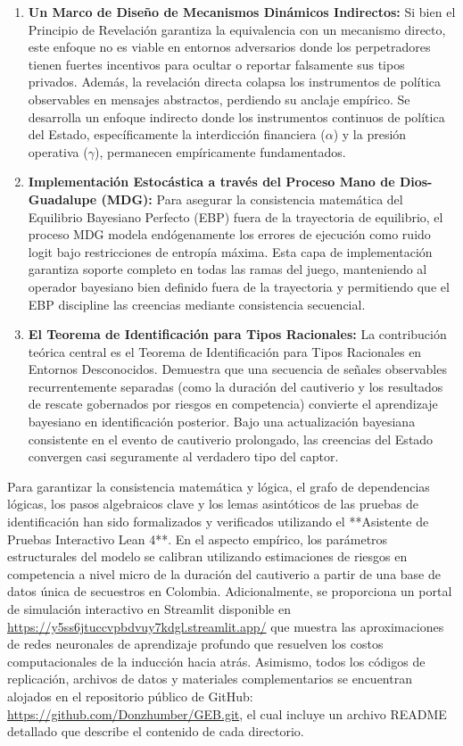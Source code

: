 \documentclass[12pt]{article}
\begin{document}
\begin{enumerate}
    \item \textbf{Un Marco de Diseño de Mecanismos Dinámicos Indirectos:} Si bien el Principio de Revelación garantiza la equivalencia con un mecanismo directo, este enfoque no es viable en entornos adversarios donde los perpetradores tienen fuertes incentivos para ocultar o reportar falsamente sus tipos privados. Además, la revelación directa colapsa los instrumentos de política observables en mensajes abstractos, perdiendo su anclaje empírico. Se desarrolla un enfoque indirecto donde los instrumentos continuos de política del Estado, específicamente la interdicción financiera ($\alpha$) y la presión operativa ($\gamma$), permanecen empíricamente fundamentados.
    
    \item \textbf{Implementación Estocástica a través del Proceso Mano de Dios-Guadalupe (MDG):} Para asegurar la consistencia matemática del Equilibrio Bayesiano Perfecto (EBP) fuera de la trayectoria de equilibrio, el proceso MDG modela endógenamente los errores de ejecución como ruido logit bajo restricciones de entropía máxima. Esta capa de implementación garantiza soporte completo en todas las ramas del juego, manteniendo al operador bayesiano bien definido fuera de la trayectoria y permitiendo que el EBP discipline las creencias mediante consistencia secuencial.
    
    \item \textbf{El Teorema de Identificación para Tipos Racionales:} La contribución teórica central es el Teorema de Identificación para Tipos Racionales en Entornos Desconocidos. Demuestra que una secuencia de señales observables recurrentemente separadas (como la duración del cautiverio y los resultados de rescate gobernados por riesgos en competencia) convierte el aprendizaje bayesiano en identificación posterior. Bajo una actualización bayesiana consistente en el evento de cautiverio prolongado, las creencias del Estado convergen casi seguramente al verdadero tipo del captor.
\end{enumerate}

Para garantizar la consistencia matemática y lógica, el grafo de dependencias lógicas, los pasos algebraicos clave y los lemas asintóticos de las pruebas de identificación han sido formalizados y verificados utilizando el **Asistente de Pruebas Interactivo Lean 4**. En el aspecto empírico, los parámetros estructurales del modelo se calibran utilizando estimaciones de riesgos en competencia a nivel micro de la duración del cautiverio a partir de una base de datos única de secuestros en Colombia. Adicionalmente, se proporciona un portal de simulación interactivo en Streamlit disponible en \url{https://y5ss6jtuccvpbdvuy7kdgl.streamlit.app/} que muestra las aproximaciones de redes neuronales de aprendizaje profundo que resuelven los costos computacionales de la inducción hacia atrás. Asimismo, todos los códigos de replicación, archivos de datos y materiales complementarios se encuentran alojados en el repositorio público de GitHub: \url{https://github.com/Donzhumber/GEB.git}, el cual incluye un archivo README detallado que describe el contenido de cada directorio.
\end{document}
